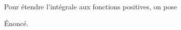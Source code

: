 \documentclass{ocots-book}
\begin{document}
Pour étendre l'intégrale aux fonctions positives, on pose
\begin{definition} %
  Énoncé.
\end{definition}
\end{document}
